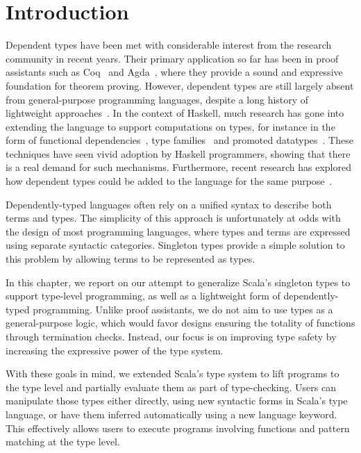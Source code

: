 \section{Introduction}

Dependent types have been met with considerable interest from the research community in recent years.
Their primary application so far has been in proof assistants such as Coq~\citep{bertot2004interactive} and Agda~\citep{norell2007towards}, where they provide a sound and expressive foundation for theorem proving.
However, dependent types are still largely absent from general-purpose programming languages, despite a long history of lightweight approaches~\citep{xi1998eliminating}.
In the context of Haskell, much research has gone into extending the language to support computations on types, for instance in the form of functional dependencies~\citep{jones2000type}, type families~\citep{kiselyov2010fun} and promoted datatypes~\citep{yorgey2012giving}.
These techniques have seen vivid adoption by Haskell programmers, showing that there is a real demand for such mechanisms.
Furthermore, recent research has explored how dependent types could be added to the language for the same purpose~\citep{eisenberg2016dependent, weirich2017a}.

Dependently-typed languages often rely on a unified syntax to describe both terms and types.
The simplicity of this approach is unfortunately at odds with the design of most programming languages, where types and terms are expressed using separate syntactic categories.
Singleton types provide a simple solution to this problem by allowing terms to be represented as types.

In this chapter, we report on our attempt to generalize Scala's singleton types to support type-level programming, as well as a lightweight form of dependently-typed programming.
Unlike proof assistants, we do not aim to use types as a general-purpose logic, which would favor designs ensuring the totality of functions through termination checks.
Instead, our focus is on improving type safety by increasing the expressive power of the type system.

With these goals in mind, we extended Scala's type system to lift programs to the type level and partially evaluate them as part of type-checking.
Users can manipulate those types either directly, using new syntactic forms in Scala's type language, or have them inferred automatically using a new language keyword.
This effectively allows users to execute programs involving functions and pattern matching at the type level.

